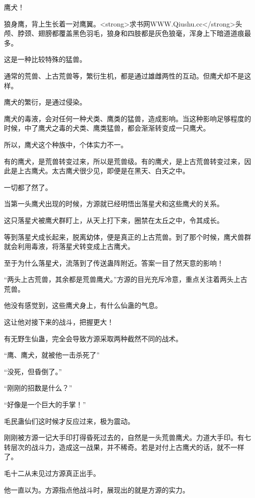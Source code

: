 
\begin{this_body}

鹰犬！

狼身鹰，背上生长着一对鹰翼。<strong>求书网WWW.Qiushu.cc</strong>头颅、脖颈、翅膀都覆盖黑色羽毛，狼身和四肢都是灰色狼毫，浑身上下暗道道痕最多。

这是一种比较特殊的猛兽。

通常的荒兽、上古荒兽等，繁衍生机，都是通过雄雌两性的互动。但鹰犬却不是这样。

鹰犬的繁衍，是通过侵染。

鹰犬的毒液，会对任何一种犬类、鹰类的猛兽，造成影响。当这种影响足够程度的时候，中了鹰犬之毒的犬类、鹰类猛兽，都会渐渐转变成一只鹰犬。

所以，鹰犬这个种族中，个体实力不一。

有的鹰犬，是荒兽转变过来，所以是荒兽级。有的鹰犬，是上古荒兽转变过来，因此是上古鹰犬。太古鹰犬很少见，即便是在黑天、白天之中。

一切都了然了。

当第一头鹰犬出现的时候，方源就已经明悟出落星犬和这些鹰犬的关系。

这只落星犬被鹰犬群盯上，从天上打下来，圈禁在太丘之中，令其成长。

等到落星犬成长起来，脱离幼体，便是真正的上古荒兽。到了那个时候，鹰犬兽群就会利用毒液，将落星犬转变成上古鹰犬。

至于为什么落星犬，流落到了传送蛊阵附近。答案一目了然天意的影响！

“两头上古荒兽，其余都是荒兽鹰犬。”方源的目光充斥冷意，重点关注着两头上古荒兽。

他没有感觉到，这些鹰犬身上，有什么仙蛊的气息。

这让他对接下来的战斗，把握更大！

有无野生仙蛊，完全会导致方源采取两种截然不同的战术。

“鹰、鹰犬，就被他一击杀死了”

“没死，但昏倒了。”

“刚刚的招数是什么？”

“好像是一个巨大的手掌！”

毛民蛊仙们这时候才反应过来，极为震动。

刚刚被方源一记大手印打得昏死过去的，自然是一头荒兽鹰犬。力道大手印。有七转层次的战斗力，造成这一战果，并不稀奇。若是对付上古鹰犬的话，就不一样了。

毛十二从未见过方源真正出手。

他一直以为。方源指点他战斗时，展现出的就是方源的实力。


\end{this_body}
